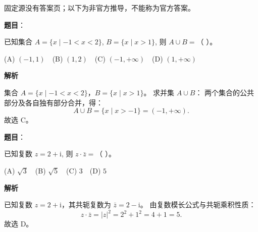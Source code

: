 
\begin{gktip}
固定源没有答案页；以下为非官方推导，不能称为官方答案。
\end{gktip}


\begin{answer}

\textbf{题目}：

已知集合 $A = \{x \mid -1 < x < 2\}$, $B = \{x \mid x > 1\}$, 则 $A \cup B =$（ ）。

(A) $(-1, 1)$　(B) $(1, 2)$　(C) $(-1, +\infty)$　(D) $(1, +\infty)$

\textbf{解析}

集合 $A = \{x \mid -1 < x < 2\}$，$B = \{x \mid x > 1\}$。
求并集 $A \cup B$：
两个集合的公共部分及各自独有部分合并，得：
\nopagebreak[4]
\[A \cup B = \{x \mid x > -1\} = (-1, +\infty).\]
故选 C。


\end{answer}
\begin{answer}

\textbf{题目}：

已知复数 $z = 2 + \mathrm{i}$, 则 $z \cdot \bar{z} =$（ ）。

(A) $\sqrt{3}$　(B) $\sqrt{5}$　(C) $3$　(D) $5$

\textbf{解析}

已知复数 $z = 2 + \mathrm{i}$，其共轭复数为 $\bar{z} = 2 - \mathrm{i}$。
由复数模长公式与共轭乘积性质：
\nopagebreak[4]
\[z \cdot \bar{z} = |z|^2 = 2^2 + 1^2 = 4 + 1 = 5.\]
故选 D。


\end{answer}
